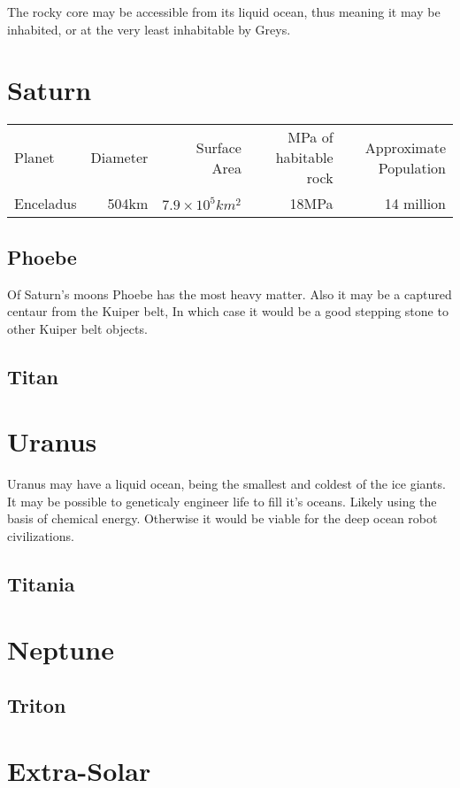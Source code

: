 The rocky core may be accessible from its liquid ocean, thus meaning it may be
inhabited, or at the very least inhabitable by Greys. 

\section{Saturn}

\begin{tabular}{lrrrr}
  Planet & Diameter & Surface Area & MPa of habitable rock & Approximate Population\\
  Enceladus  & 504km & $7.9\times10^5km^2$ & 18MPa &  14 million\\
\end{tabular}

\subsection{Phoebe}

Of Saturn's moons Phoebe has the most heavy matter.  
Also it may be a captured centaur from the Kuiper belt, 
In which case it would be a good stepping stone to other Kuiper belt objects.

\subsection{Titan}

\section{Uranus}
Uranus may have a liquid ocean, being the smallest and coldest of the ice
giants.  It may be possible to geneticaly engineer life to fill it's oceans. 
Likely using the basis of chemical energy. Otherwise it would be viable for the
deep ocean robot civilizations. 


\subsection{Titania}

\section{Neptune}
\subsection{Triton}


\section{Extra-Solar}

